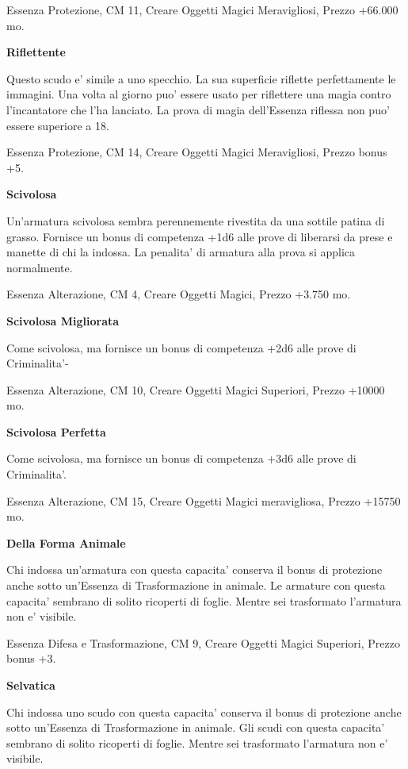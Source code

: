 \documentclass[a4paper,11pt,twoside,openany]{book}
\begin{document}
{		Essenza Protezione, CM 11, Creare Oggetti Magici Meravigliosi, Prezzo +66.000 mo.
		
		\textbf{Riflettente}
		
		Questo scudo e' simile a uno specchio. La sua superficie riflette perfettamente le immagini. Una volta al giorno puo' essere usato per riflettere una magia contro l'incantatore che l'ha lanciato. La prova di magia dell'Essenza riflessa non puo' essere superiore a 18.
		
		Essenza Protezione, CM 14, Creare Oggetti Magici Meravigliosi, Prezzo 
		bonus +5.
		
		\textbf{Scivolosa}
		
		Un'armatura scivolosa sembra perennemente rivestita da una sottile patina di grasso. Fornisce un bonus di competenza +1d6 alle prove di liberarsi da prese e manette di chi la indossa. La penalita' di armatura alla prova si applica normalmente.
		
		Essenza Alterazione, CM 4, Creare Oggetti Magici, Prezzo +3.750 mo.
		
		\textbf{Scivolosa Migliorata}
		
		Come scivolosa, ma fornisce un bonus di competenza +2d6 alle prove di Criminalita'-
		
		Essenza Alterazione, CM 10, Creare Oggetti Magici Superiori, Prezzo +10000 mo.
		
		\textbf{Scivolosa Perfetta}
		
		Come scivolosa, ma fornisce un bonus di competenza +3d6 alle prove di Criminalita'.
		
		Essenza Alterazione, CM 15, Creare Oggetti Magici meravigliosa, Prezzo +15750 mo.
		
		\textbf{Della Forma Animale}
		
		Chi indossa un'armatura con questa capacita' conserva il bonus di protezione anche sotto un'Essenza di Trasformazione in animale. Le armature con questa capacita' sembrano di solito ricoperti di foglie. Mentre sei trasformato l'armatura non e' visibile.
		
		Essenza Difesa e Trasformazione, CM 9, Creare Oggetti Magici Superiori, Prezzo bonus +3.
		
		\textbf{Selvatica}
		
		Chi indossa uno scudo con questa capacita' conserva il bonus di protezione anche sotto un'Essenza di Trasformazione in animale. Gli scudi con questa capacita' sembrano di solito ricoperti di foglie. Mentre sei trasformato l'armatura non e' visibile.
		
}
\end{document}
